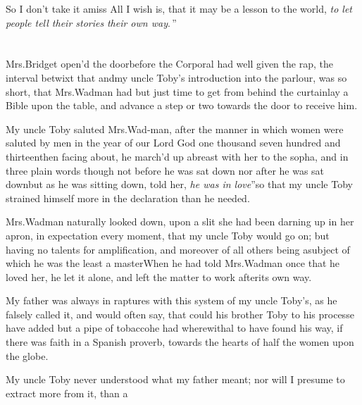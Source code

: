 \documentclass{article}
\begin{document}
\tsh So I don’t take it amiss\tsh\break
All I wish is, that it may be a lesson to\break
the world, \lqq \textit{to let people tell their stories}\break
\lqq \textit{their own way}.\,”

\vfill
\rightline{\rlap{\quad\club}}\eject
\null{}\baselineskip
\section{}

 Mrs.\@ Bridget open’d the
door\break before the Corporal had well given the rap, the interval
betwixt that and\break my uncle Toby’s introduction into the
parlour, was so short, that Mrs.\@ Wadman had but just time to
get from behind the curtain\tsh lay a Bible upon the
table, and advance a step or two towards the door to receive
him.

My uncle Toby saluted Mrs.\@ Wad-\break man, after the
manner in which women were saluted by men in the year of our Lord
God one thousand seven hundred and thirteen\tsh then
facing about, he march’d up abreast with her to the sopha,
and in three plain words\tsk\tsk\break 
though not before he was sat down\tsh\break
nor after he was sat down\tsh\break but as he
was sitting down, told her,\break 
\lqq \textit{he was in love}”\tsh so that my uncle Toby strained
himself more in the declaration than he needed.

Mrs.\@ Wadman naturally looked down, upon a slit she had
been darning up in her apron, in expectation every moment, that my
uncle Toby would go on; but having no talents for
amplification, and  moreover of all others being a\break subject of
which he was the least a master\tsh When he had told 
Mrs.\@ Wadman once that he loved her, he let it alone, and left the
matter to work after\break its own way.

My father was always in raptures with this system of my uncle
Toby’s, as he falsely called it, and would often say,
that could his brother Toby to his processe have added but a
pipe of tobacco\tsh \break he had wherewithal to have found his
way, if there was faith in a Spanish proverb, towards the
hearts of half the women upon the globe.

My uncle Toby never understood what my father meant; nor
will I presume to extract more from it, than a\break
{}
\end{document}

